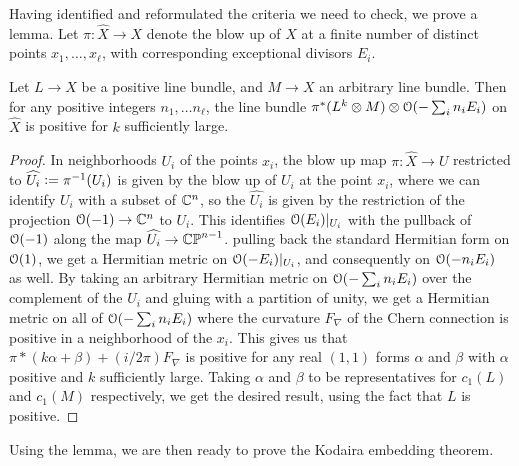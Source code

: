 Having identified and reformulated the criteria we need to check, we
prove a lemma. Let $\pi : \widehat{X} \to X$ denote the blow up of $X$
at a finite number of distinct points $x_1,\ldots, x_\ell$, with corresponding
exceptional divisors $E_i$.
%
\begin{lem}
Let $L \to X$ be a positive line bundle, and $M \to X$ an arbitrary line bundle.
Then for any positive integers $n_1,\ldots n_\ell$, the line bundle
$\pi^*(L^k \otimes M) \otimes \mathcal{O}(-\sum_i n_iE_i)$ on $\widehat{X}$ is
positive for $k$ sufficiently large.
\end{lem}
%
\begin{proof}
In neighborhoods $U_i$ of the points $x_i$, the blow up map
$\pi : \widehat{X} \to U$ restricted to $\widehat{U_i} \vcentcolon= \pi^{-1}(U_i)$
is given by the blow up of $U_i$ at the point $x_i$, where we can identify
$U_i$ with a subset of $\mathbb{C}^n$, so the $\widehat{U_i}$ is given by the restriction of
the projection $\mathcal{O}(-1) \to \mathbb{C}^n$ to $U_i$. This identifies $\mathcal{O}(E_i)\vert_{U_i}$
with the pullback of $\mathcal{O}(-1)$ along the map $\widehat{U_i} \to \mathbb{CP}^{n-1}$.
pulling back the standard Hermitian form on $\mathcal{O}(1)$, we get a Hermitian metric
on $\mathcal{O}(-E_i)\vert_{U_i}$, and consequently on $\mathcal{O}(-n_iE_i)$ as well. By taking an
arbitrary Hermitian metric on $\mathcal{O}(-\sum_i n_iE_i)$ over the complement of the
$U_i$ and gluing with a partition of unity, we get a Hermitian metric on all
of $\mathcal{O}(-\sum_i n_iE_i)$ where the curvature $F_\nabla$ of the Chern connection
is positive in a neighborhood of the $x_i$. This gives us that
$\pi*(k\alpha + \beta) + (i/2\pi)F_\nabla$ is positive for any real $(1,1)$
forms $\alpha$ and $\beta$ with $\alpha$ positive and $k$ sufficiently large.
Taking $\alpha$ and $\beta$ to be representatives for $c_1(L)$ and $c_1(M)$
respectively, we get the desired result, using the fact that $L$ is positive.
\end{proof}
%
Using the lemma, we are then ready to prove the Kodaira embedding theorem.
%
